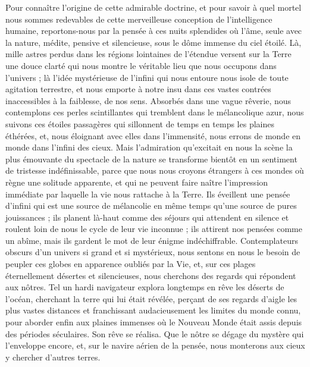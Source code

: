 \documentclass[a4paper, 11pt, oneside]{article}
\begin{document}
Pour connaître l'origine de cette admirable doctrine, et pour savoir à quel mortel nous sommes redevables de cette merveilleuse conception de l'intelligence humaine, reportons-nous par la pensée à ces nuits splendides où l'âme, seule avec la nature, médite, pensive et silencieuse, sous le dôme immense du ciel étoilé. Là, mille astres perdus dans les régions lointaines de l'étendue versent sur la Terre une douce clarté qui nous montre le véritable lieu que nous occupons dans l'univers ; là l'idée mystérieuse de l'infini qui nous entoure nous isole de toute agitation terrestre, et nous emporte à notre insu dans ces vastes contrées inaccessibles à la faiblesse, de nos sens. Absorbés dans une vague rêverie, nous contemplons ces perles scintillantes qui tremblent dans le mélancolique azur, nous suivons ces étoiles passagères qui sillonnent de temps en temps les plaines éthérées, et, nous éloignant avec elles dans l'immensité, nous errons de monde en monde dans l'infini des cieux. Mais l'admiration qu'excitait en nous la scène la plus émouvante du spectacle de la nature se transforme bientôt en un sentiment de tristesse indéfinissable, parce que nous nous croyons étrangers à ces mondes où règne une solitude apparente, et qui ne peuvent faire naître l'impression immédiate par laquelle la vie nous rattache à la Terre. Ils éveillent une pensée d'infini qui est une source de mélancolie en même temps qu'une source de pures jouissances ; ils planent là-haut comme des séjours qui attendent en silence et roulent loin de nous le cycle de leur vie inconnue ; ils attirent nos pensées comme un abîme, mais ils gardent le mot de leur énigme indéchiffrable. Contemplateurs obscurs d'un univers si grand et si mystérieux, nous sentons en nous le besoin de peupler ces globes en apparence oubliés par la Vie, et, sur ces plages éternellement désertes et silencieuses, nous cherchons des regards qui répondent aux nôtres. Tel un hardi navigateur explora longtemps en rêve les déserts de l'océan, cherchant la terre qui lui était révélée, perçant de ses regards d'aigle les plus vastes distances et franchissant audacieusement les limites du monde connu, pour aborder enfin aux plaines immenses où le Nouveau Monde était assis depuis des périodes séculaires. Son rêve se réalisa. Que le nôtre se dégage du mystère qui l'enveloppe encore, et, sur le navire aérien de la pensée, nous monterons aux cieux y chercher d'autres terres.
\end{document}
